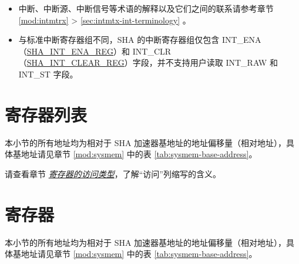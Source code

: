 \documentclass[main\_\_CN.tex]{subfiles}
\begin{document}
\begin{tiplisting}
\vspace{-2.5em}
\begin{itemize}
    \item 中断、中断源、中断信号等术语的解释以及它们之间的联系请参考章节 \ref{mod:intmtrx} \textit{} > \ref{sec:intmtx-int-terminology} \textit{}。
    \item 与标准中断寄存器组不同，SHA 的中断寄存器组仅包含 INT\_ENA（\hyperref[regdesc:SHAINTENAREG]{SHA\_INT\_ENA\_REG}）和 INT\_CLR \\（\hyperref[regdesc:SHAINTCLEARREG]{SHA\_INT\_CLEAR\_REG}）字段，并不支持用户读取 INT\_RAW 和 INT\_ST 字段。
\end{itemize}
\end{tiplisting}




\newpage
\hypertarget{sha-reg-summ}{}
\section{寄存器列表} \label{sec:sha-reg-summ}

本小节的所有地址均为相对于 SHA 加速器基地址的地址偏移量（相对地址），具体基地址请见章节 \ref{mod:sysmem} \textit{} 中的表 \ref{tab:sysmem-base-address}。

请查看章节 \hyperref[glossary-access-types]{\textit{寄存器的访问类型}}，了解“访问”列缩写的含义。



\section{寄存器}

本小节的所有地址均为相对于 SHA 加速器基地址的地址偏移量（相对地址），具体基地址请见章节 \ref{mod:sysmem} \textit{} 中的表 \ref{tab:sysmem-base-address}。


\end{document}
